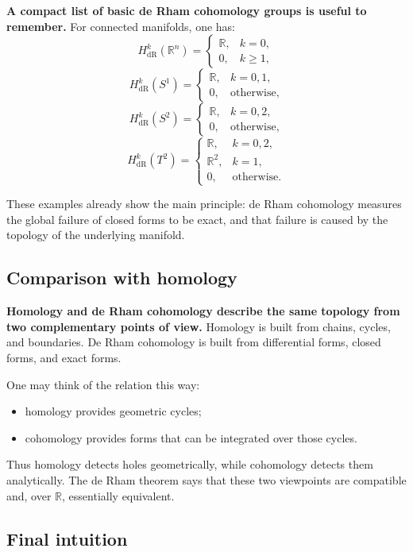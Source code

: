 \documentclass[12pt,a4paper]{article}
\theoremstyle{notespace}
\begin{document}
\textbf{A compact list of basic de Rham cohomology groups is useful to remember.} For connected manifolds, one has:
\[
H^k_{\mathrm{dR}}(\mathbb{R}^n)=
\begin{cases}
	\mathbb{R}, & k=0,\\
	0, & k\ge 1,
\end{cases}
\]
\[
H^k_{\mathrm{dR}}(S^1)=
\begin{cases}
	\mathbb{R}, & k=0,1,\\
	0, & \text{otherwise},
\end{cases}
\]
\[
H^k_{\mathrm{dR}}(S^2)=
\begin{cases}
	\mathbb{R}, & k=0,2,\\
	0, & \text{otherwise},
\end{cases}
\]
\[
H^k_{\mathrm{dR}}(T^2)=
\begin{cases}
	\mathbb{R}, & k=0,2,\\
	\mathbb{R}^2, & k=1,\\
	0, & \text{otherwise}.
\end{cases}
\]

These examples already show the main principle: de Rham cohomology measures the global failure of closed forms to be exact, and that failure is caused by the topology of the underlying manifold.

\subsection{Comparison with homology}

\textbf{Homology and de Rham cohomology describe the same topology from two complementary points of view.} Homology is built from chains, cycles, and boundaries. De Rham cohomology is built from differential forms, closed forms, and exact forms.

One may think of the relation this way:

\begin{itemize}
	\item homology provides geometric cycles;
	\item cohomology provides forms that can be integrated over those cycles.
\end{itemize}

Thus homology detects holes geometrically, while cohomology detects them analytically. The de Rham theorem says that these two viewpoints are compatible and, over \(\mathbb{R}\), essentially equivalent.

\subsection{Final intuition}
\end{document}

